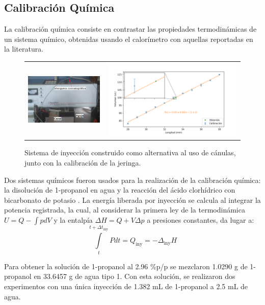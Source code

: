 \documentclass[a0]{sciposter}
\begin{document}
\begin{multicols}{3}
\section{Calibraci\'on Qu\'imica}
	La calibraci\'on qu\'imica consiste en contrastar las propiedades termodin\'amicas de un sistema qu\'imico, obtenidas usando el calor\'imetro con aquellas reportadas en la literatura. 
	\begin{figure}[h]
		\centering
		\begin{tabular}{cc}
			\includegraphics[width=0.4\linewidth]{../Tesis/Figures/sistemaInyeccion} & 
			\includegraphics[width=0.6\linewidth]{../Data/Syringe/syringe_cal.png}
		\end{tabular}
		\caption{Sistema de inyección construido como alternativa al uso de cánulas, junto con la calibración de la jeringa.}
	\end{figure}

	Dos sistemas qu\'imicos fueron usados para la realizaci\'on de la calibraci\'on qu\'imica: la disoluci\'on de 1-propanol en agua y la reacci\'on del \'acido clorhídrico con bicarbonato de potasio \cite{demarse2011calibration, adao2012chemical, nanoitc}. La energía liberada por inyección se calcula al integrar la potencia registrada, la cual, al considerar la primera ley de la termodinámica $U = Q-\int pdV$ y la entalpía $\Delta H = Q + V\Delta p$ a presiones constantes, da lugar a:
	\begin{equation}
		\int\limits_t^{t+\Delta t_\text{iny}} Pdt = Q_\text{iny} = -\Delta_\text{iny}H
	\end{equation}
	
	Para obtener la soluci\'on de 1-propanol al 2.96 \%p/p se mezclaron 1.0290 g de 1-propanol en 33.6457 g de agua tipo 1. Con esta soluci\'on, se realizaron dos experimentos con una \'unica inyecci\'on de 1.382 mL de 1-propanol a 2.5 mL de agua.
	

\end{multicols}
\end{document}
